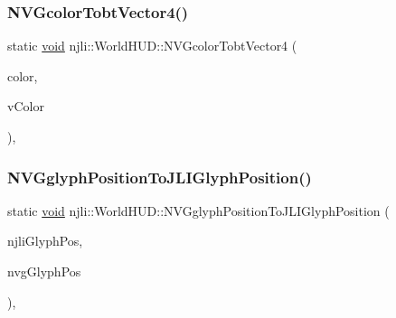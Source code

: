 \mbox{\label{classnjli_1_1_world_h_u_d_a0f4a1e7b62c85ee6176e90963abc3dc3}} 
\subsubsection{\texorpdfstring{N\+V\+Gcolor\+Tobt\+Vector4()}{NVGcolorTobtVector4()}}
{\footnotesize\ttfamily static \mbox{\hyperlink{_thread_8h_af1e856da2e658414cb2456cb6f7ebc66}{void}} njli\+::\+World\+H\+U\+D\+::\+N\+V\+Gcolor\+Tobt\+Vector4 (\begin{DoxyParamCaption}\item[{bt\+Vector4 \&}]{color,  }\item[{const N\+V\+Gcolor \&}]{v\+Color }\end{DoxyParamCaption})\hspace{0.3cm}{\ttfamily [static]}, {\ttfamily [protected]}}

\mbox{\label{classnjli_1_1_world_h_u_d_a13e6d9af851da8945d118b874eb5ab94}} 
\subsubsection{\texorpdfstring{N\+V\+Gglyph\+Position\+To\+J\+L\+I\+Glyph\+Position()}{NVGglyphPositionToJLIGlyphPosition()}}
{\footnotesize\ttfamily static \mbox{\hyperlink{_thread_8h_af1e856da2e658414cb2456cb6f7ebc66}{void}} njli\+::\+World\+H\+U\+D\+::\+N\+V\+Gglyph\+Position\+To\+J\+L\+I\+Glyph\+Position (\begin{DoxyParamCaption}\item[{\mbox{\hyperlink{structnjli_1_1_j_l_i_glyph_position}{J\+L\+I\+Glyph\+Position}} \&}]{njli\+Glyph\+Pos,  }\item[{const N\+V\+Gglyph\+Position \&}]{nvg\+Glyph\+Pos }\end{DoxyParamCaption})\hspace{0.3cm}{\ttfamily [static]}, {\ttfamily [protected]}}

